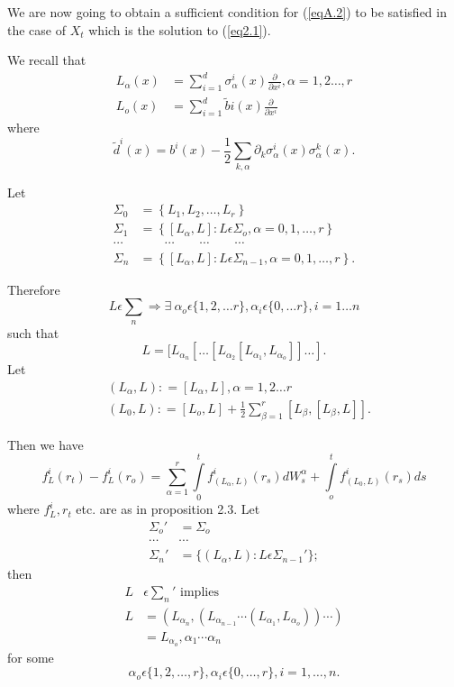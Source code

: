 We are now going to obtain a sufficient condition for (\ref{eqA.2}) to be
satisfied in the case of $X_t$ which is the solution to (\ref{eq2.1}). 

We recall that
\begin{align*}
  L_{\alpha}(x) & = \sum_{i=1}^{d} \sigma_{\alpha}^{i}(x)
  \frac{\partial}{\partial x^{i}}, \alpha = 1, 2 \ldots, r\\ 
  L_{o} (x) & = \sum_{i = 1}^{d} \tilde{b}i (x)
  \frac{\partial}{\partial x ^{i}} 
\end{align*}
where
$$
\tilde{d}^i (x) = b^i (x) - \frac{1}{2}\sum_{k, \alpha } 
\partial_{k}\sigma_{\alpha}^{i}(x) \sigma_{\alpha}^{k}(x). 
$$

Let 
\begin{align*}
  \Sigma_0 & = \left\{ L_1, L_2, \ldots, L_r \right\}\\
  \Sigma_1 & = \left\{ [L_{\alpha}, L]: L \epsilon  \Sigma_o, \alpha =
  0, 1, \ldots, r \right\}\\  
  \cdots & \qquad \cdots \qquad \cdots \qquad \cdots \\
  \Sigma_n & = \left\{ [ L_\alpha, L ]: L \epsilon  \Sigma_{n-1}, \alpha
  = 0, 1,\ldots, r \right\}. 
\end{align*}

Therefore\pageoriginale
$$ 
L \epsilon  \sum_{n}\Rightarrow \exists~  \alpha_o \epsilon  \{1,
2, \ldots r \}, \alpha _i \epsilon  \{0, \ldots r \}, i= 1 \ldots
n 
$$
such that  
$$
L = [ L_{\alpha _{n}} [\ldots[L_{\alpha_{2}}[L _{\alpha_{1}},
        L_{\alpha_{o}}]]\ldots ]. 
$$
Let
\begin{align*}
  &(L_\alpha, L): = [L_ \alpha, L], \alpha = 1, 2 \ldots r\\
  &(L_0, L): = [L_o, L] + \frac{1}{2} \sum_{\beta =1}^{r} [L_{\beta},
    [L_{\beta}, L]]. 
\end{align*}

Then we have
$$
f_L^i (r_t) - f_L^i (r_o)= \sum_{\alpha = 1}^{r} \int\limits_{0}^{t} 
f^i _{(L_{\alpha},L)} (r_s) dW_s^{\alpha} + \int\limits_o^t f^i
_{(L_{0}, L)}(r_s) ds 
$$ 
where $f_L^i, r_t $ etc. are as in proposition 2.3. Let 
\begin{align*}
  \Sigma_{o}'& = \Sigma_o \\
  \cdots & \cdots\\
  \Sigma_n ' & = \{ (L_{\alpha}, L ): L \epsilon  \Sigma_{n - 1}' \} ;
\end{align*}
then
\begin{align*}
  L&\epsilon  \sum_n ' \text{ implies }\\
  L&= (L_{\alpha _{n}}, (L_{\alpha_{n-1}}\cdots (L_{\alpha_{1}},
  L_{\alpha_{o}})) \cdots ) \\ 
  &= L_{\alpha_{o}}, \alpha _1 \cdots \alpha_n
\end{align*}
for some
$$
\alpha_{o} \epsilon  \{ 1,2,\ldots, r\}, \alpha_i \epsilon  \{
0, \ldots, r\}, i = 1, \ldots, n. 
$$

